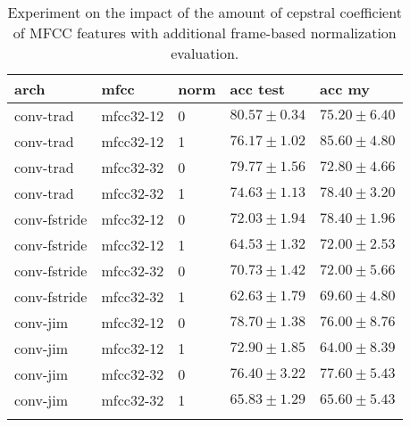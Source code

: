 \begin{table}[ht!]
\begin{center}
\caption{Experiment on the impact of the amount of cepstral coefficient of MFCC features with additional frame-based normalization evaluation.}
\begin{tabular}{ M{3cm}  M{2cm}  M{2cm}  M{2.5cm}  M{2.5cm} }
\toprule
\textbf{arch} & \textbf{mfcc} & \textbf{norm} & \textbf{acc test} & \textbf{acc my} \\
\midrule
conv-trad & mfcc32-12 & 0 & $80.57 \pm 0.34$ & $75.20 \pm 6.40$ \\
conv-trad & mfcc32-12 & 1 & $76.17 \pm 1.02$ & $85.60 \pm 4.80$ \\
conv-trad & mfcc32-32 & 0 & $79.77 \pm 1.56$ & $72.80 \pm 4.66$ \\
conv-trad & mfcc32-32 & 1 & $74.63 \pm 1.13$ & $78.40 \pm 3.20$ \\
conv-fstride & mfcc32-12 & 0 & $72.03 \pm 1.94$ & $78.40 \pm 1.96$ \\
conv-fstride & mfcc32-12 & 1 & $64.53 \pm 1.32$ & $72.00 \pm 2.53$ \\
conv-fstride & mfcc32-32 & 0 & $70.73 \pm 1.42$ & $72.00 \pm 5.66$ \\
conv-fstride & mfcc32-32 & 1 & $62.63 \pm 1.79$ & $69.60 \pm 4.80$ \\
conv-jim & mfcc32-12 & 0 & $78.70 \pm 1.38$ & $76.00 \pm 8.76$ \\
conv-jim & mfcc32-12 & 1 & $72.90 \pm 1.85$ & $64.00 \pm 8.39$ \\
conv-jim & mfcc32-32 & 0 & $76.40 \pm 3.22$ & $77.60 \pm 5.43$ \\
conv-jim & mfcc32-32 & 1 & $65.83 \pm 1.29$ & $65.60 \pm 5.43$ \\
\bottomrule
\label{tab:exp_fs_cepstral_l12}
\end{tabular}
\end{center}
\vspace{-4mm}
\end{table}
\FloatBarrier
\noindent